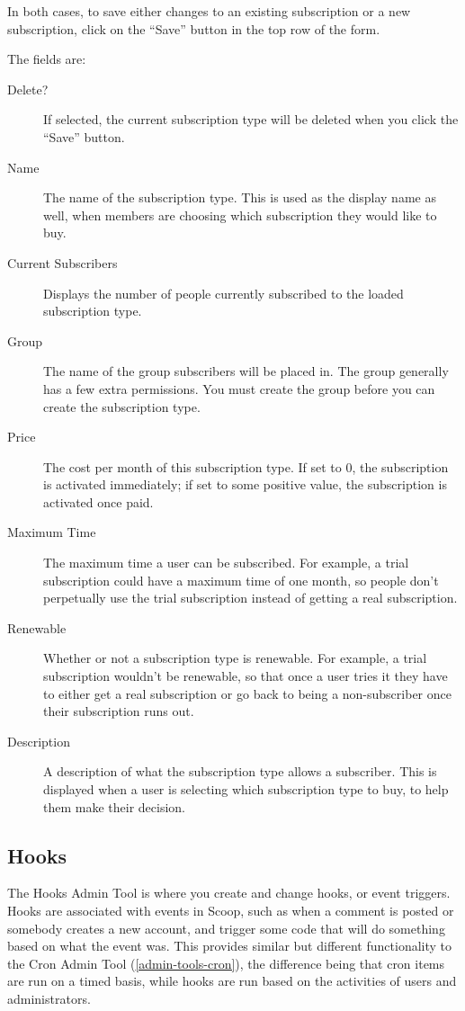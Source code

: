 In both cases, to save either changes to an existing subscription or a new subscription, click on the ``Save'' button in the top row of the form.

The fields are:

\begin{description}
\item[Delete?] If selected, the current subscription type will be deleted when you click the ``Save'' button.
\item[Name] The name of the subscription type. This is used as the display name as well, when members are choosing which subscription they would like to buy.
\item[Current Subscribers] Displays the number of people currently subscribed to the loaded subscription type.
\item[Group] The name of the group subscribers will be placed in. The group generally has a few extra permissions. You must create the group before you can create the subscription type.
\item[Price] The cost per month of this subscription type. If set to 0, the subscription is activated immediately; if set to some positive value, the subscription is activated once paid.
\item[Maximum Time] The maximum time a user can be subscribed. For example, a trial subscription could have a maximum time of one month, so people don't perpetually use the trial subscription instead of getting a real subscription.
\item[Renewable] Whether or not a subscription type is renewable. For example, a trial subscription wouldn't be renewable, so that once a user tries it they have to either get a real subscription or go back to being a non-subscriber once their subscription runs out.
\item[Description] A description of what the subscription type allows a subscriber. This is displayed when a user is selecting which subscription type to buy, to help them make their decision.
\end{description}

\subsection{Hooks}
\label{admin-tools-hooks}

The Hooks Admin Tool is where you create and change hooks, or event triggers. Hooks are associated with events in Scoop, such as when a comment is posted or somebody creates a new account, and trigger some code that will do something based on what the event was. This provides similar but different functionality to the Cron Admin Tool (\ref{admin-tools-cron}), the difference being that cron items are run on a timed basis, while hooks are run based on the activities of users and administrators.

